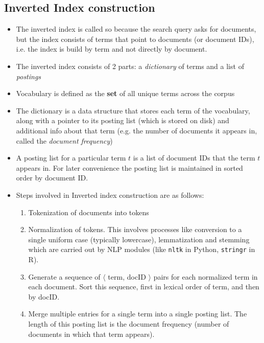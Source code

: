 \documentclass{article}
\begin{document}
\subsection{Inverted Index construction}
\begin{itemize}

    \item The inverted index is called so because the search query asks for documents, but the index consists of terms that point to documents (or document IDs), i.e. the index is build by term and not directly by document.
    
    \item The inverted index consists of 2 parts: a \textit{dictionary} of terms and a list of \textit{postings}
    
    \item Vocabulary is defined as the \textbf{set} of all unique terms across the corpus
    
    \item The dictionary is a data structure that stores each term of the vocabulary, along with a pointer to its posting list (which is stored on disk) and additional info about that term (e.g. the number of documents it appears in, called the \textit{document frequency})
    
    \item A posting list for a particular term $t$ is a list of document IDs that the term $t$ appears in. For later convenience the posting list is maintained in sorted order by document ID.
    
    \item Steps involved in Inverted index construction are as follows:
    \begin{enumerate}
        \item Tokenization of documents into tokens
        
        \item Normalization of tokens. This involves processes like conversion to a single uniform case (typically lowercase), lemmatization and stemming which are carried out by NLP modules (like \texttt{nltk} in Python, \texttt{stringr} in R). 
        
        \item Generate a sequence of $\langle$ term, docID $\rangle$ pairs for each normalized term in each document. Sort this sequence, first in lexical order of term, and then by docID.
        
        \item Merge multiple entries for a single term into a single posting list. The length of this posting list is the document frequency (number of documents in which that term appears). 
        

\end{enumerate}
\end{itemize}
\end{document}
